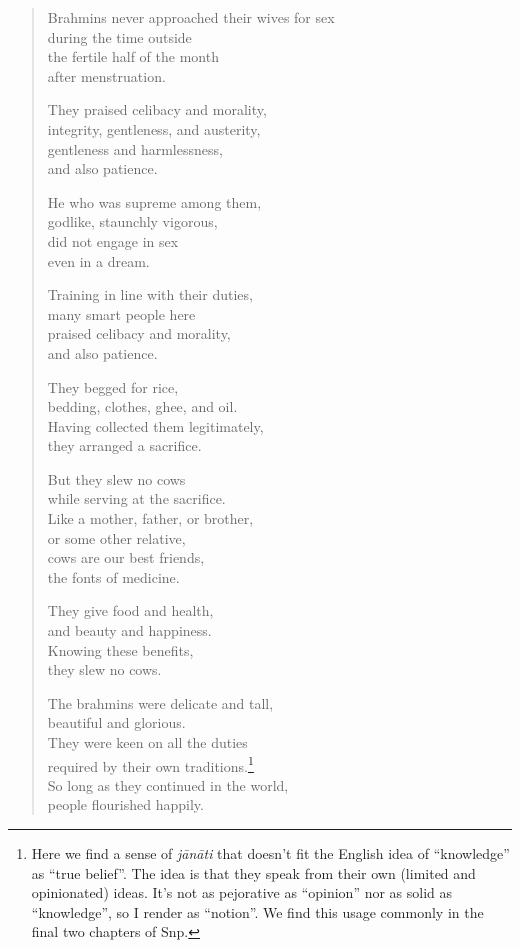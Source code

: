\documentclass[12pt,openany]{book}%
\begin{document}
\begin{verse}
Brahmins never approached their wives for sex \\
during the time outside \\
the fertile half of the month \\
after menstruation. 

They praised celibacy and morality, \\
integrity, gentleness, and austerity, \\
gentleness and harmlessness, \\
and also patience. 

He who was supreme among them, \\
godlike, staunchly vigorous, \\
did not engage in sex \\
even in a dream. 

Training in line with their duties, \\
many smart people here \\
praised celibacy and morality, \\
and also patience. 

They begged for rice, \\
bedding, clothes, ghee, and oil. \\
Having collected them legitimately, \\
they arranged a sacrifice. 

But they slew no cows \\
while serving at the sacrifice. \\
Like a mother, father, or brother, \\
or some other relative, \\
cows are our best friends, \\
the fonts of medicine. 

They give food and health, \\
and beauty and happiness. \\
Knowing these benefits, \\
they slew no cows. 

The brahmins were delicate and tall, \\
beautiful and glorious. \\
They were keen on all the duties \\
required by their own traditions.\footnote{Here we find a sense of \textit{\textsanskrit{jānāti}} that doesn’t fit the English idea of “knowledge” as “true belief”. The idea is that they speak from their own (limited and opinionated) ideas. It’s not as pejorative as “opinion” nor as solid as “knowledge”, so I render as “notion”. We find this usage commonly in the final two chapters of Snp. } \\
So long as they continued in the world, \\
people flourished happily. 


\end{verse}
\end{document}
